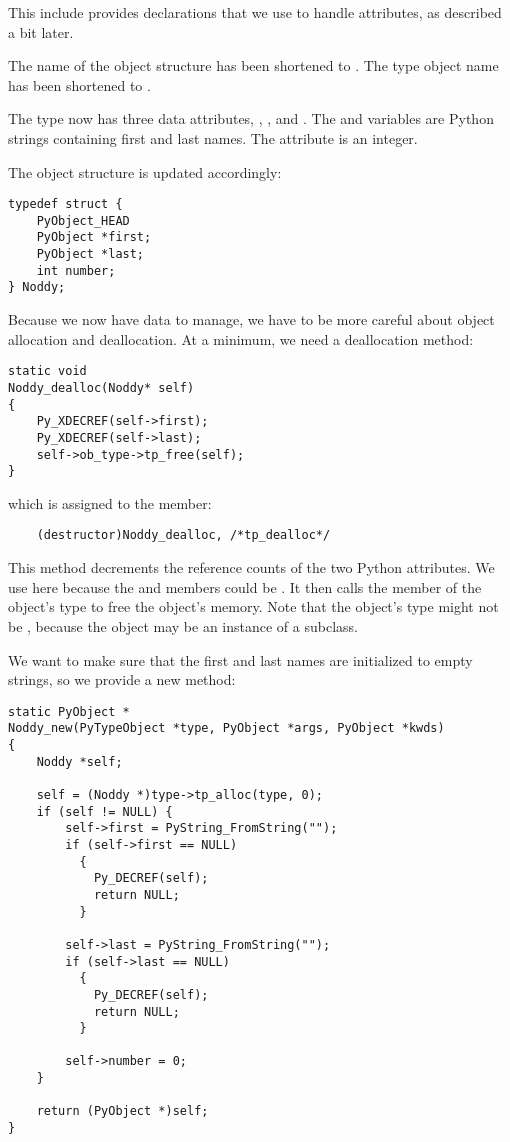 This include provides declarations that we use to handle attributes,
as described a bit later.

The name of the  object structure has been shortened to
.  The type object name has been shortened to
.

The   type now has three data attributes, ,
, and .  The  and 
variables are Python strings containing first and last names. The
 attribute is an integer.

The object structure is updated accordingly:

\begin{verbatim}
typedef struct {
    PyObject_HEAD
    PyObject *first;
    PyObject *last;
    int number;
} Noddy;
\end{verbatim}

Because we now have data to manage, we have to be more careful about
object allocation and deallocation.  At a minimum, we need a
deallocation method:

\begin{verbatim}
static void
Noddy_dealloc(Noddy* self)
{
    Py_XDECREF(self->first);
    Py_XDECREF(self->last);
    self->ob_type->tp_free(self);
}
\end{verbatim}

which is assigned to the  member:

\begin{verbatim}
    (destructor)Noddy_dealloc, /*tp_dealloc*/
\end{verbatim}

This method decrements the reference counts of the two Python
attributes. We use  here because the
 and  members could be \NULL.  It then
calls the  member of the object's type to free the
object's memory.  Note that the object's type might not be
, because the object may be an instance of a
subclass.

We want to make sure that the first and last names are initialized to
empty strings, so we provide a new method:

\begin{verbatim}
static PyObject *
Noddy_new(PyTypeObject *type, PyObject *args, PyObject *kwds)
{
    Noddy *self;

    self = (Noddy *)type->tp_alloc(type, 0);
    if (self != NULL) {
        self->first = PyString_FromString("");
        if (self->first == NULL)
          {
            Py_DECREF(self);
            return NULL;
          }
        
        self->last = PyString_FromString("");
        if (self->last == NULL)
          {
            Py_DECREF(self);
            return NULL;
          }

        self->number = 0;
    }

    return (PyObject *)self;
}
\end{verbatim}

